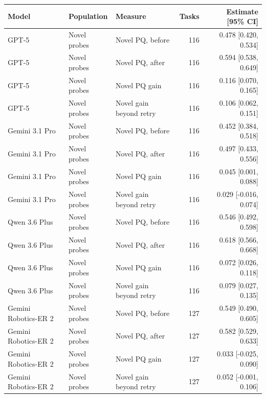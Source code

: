 \begin{tabular}{lllrr}
\toprule
Model & Population & Measure & Tasks & Estimate [95\% CI] \\
\midrule
GPT-5 & Novel probes & Novel PQ, before & 116 & 0.478 [0.420, 0.534] \\
GPT-5 & Novel probes & Novel PQ, after & 116 & 0.594 [0.538, 0.649] \\
GPT-5 & Novel probes & Novel PQ gain & 116 & 0.116 [0.070, 0.165] \\
GPT-5 & Novel probes & Novel gain beyond retry & 116 & 0.106 [0.062, 0.151] \\
Gemini 3.1 Pro & Novel probes & Novel PQ, before & 116 & 0.452 [0.384, 0.518] \\
Gemini 3.1 Pro & Novel probes & Novel PQ, after & 116 & 0.497 [0.433, 0.556] \\
Gemini 3.1 Pro & Novel probes & Novel PQ gain & 116 & 0.045 [0.001, 0.088] \\
Gemini 3.1 Pro & Novel probes & Novel gain beyond retry & 116 & 0.029 [-0.016, 0.074] \\
Qwen 3.6 Plus & Novel probes & Novel PQ, before & 116 & 0.546 [0.492, 0.598] \\
Qwen 3.6 Plus & Novel probes & Novel PQ, after & 116 & 0.618 [0.566, 0.668] \\
Qwen 3.6 Plus & Novel probes & Novel PQ gain & 116 & 0.072 [0.026, 0.118] \\
Qwen 3.6 Plus & Novel probes & Novel gain beyond retry & 116 & 0.079 [0.027, 0.135] \\
Gemini Robotics-ER 2 & Novel probes & Novel PQ, before & 127 & 0.549 [0.490, 0.605] \\
Gemini Robotics-ER 2 & Novel probes & Novel PQ, after & 127 & 0.582 [0.529, 0.633] \\
Gemini Robotics-ER 2 & Novel probes & Novel PQ gain & 127 & 0.033 [-0.025, 0.090] \\
Gemini Robotics-ER 2 & Novel probes & Novel gain beyond retry & 127 & 0.052 [-0.001, 0.106] \\
\bottomrule
\end{tabular}
